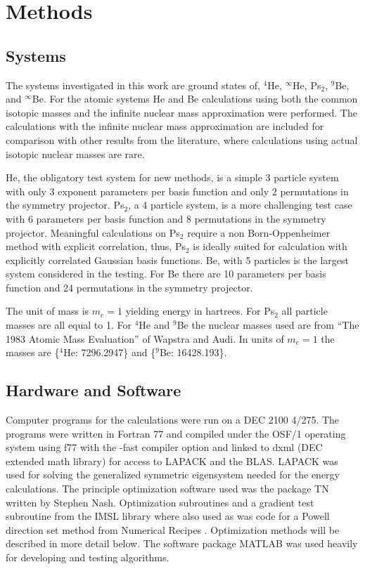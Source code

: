 \documentclass[12pt,thmsa,suthesis,verbatim]{report}
\begin{document}
\section{Methods}

\subsection{Systems}

The systems investigated in this work are ground states of, $^4$He, $^\infty 
$He, Ps$_2$, $^9$Be, and $^\infty $Be. For the atomic systems He and Be
calculations using both the common isotopic masses and the infinite nuclear
mass approximation were performed. The calculations with the infinite
nuclear mass approximation are included for comparison with other results
from the literature, where calculations using actual isotopic nuclear masses
are rare.

He, the obligatory test system for new methods, is a simple 3 particle
system with only 3 exponent parameters per basis function and only 2
permutations in the symmetry projector. Ps$_2$, a 4 particle system, is a
more challenging test case with 6 parameters per basis function and 8
permutations in the symmetry projector. Meaningful calculations on Ps$_2$
require a non Born-Oppenheimer method with explicit correlation, thus, Ps$_2$
is ideally suited for calculation with explicitly correlated Gaussian basis
functions. Be, with 5 particles is the largest system considered in the
testing. For Be there are 10 parameters per basis function and 24
permutations in the symmetry projector.

The unit of mass is $m_e=1$ yielding energy in hartrees. For Ps$_2$ all
particle masses are all equal to 1. For $^4$He and $^9$Be the nuclear masses
used are from ``The 1983 Atomic Mass Evaluation'' of Wapstra and Audi\cite
{Wapstra}. In units of $m_e=1$ the masses are \{$^4$He: 7296.2947\} and \{$%
^9 $Be: 16428.193\}.

\subsection{Hardware and Software}

Computer programs for the calculations were run on a DEC 2100 4/275. The
programs were written in Fortran 77 and compiled under the OSF/1 operating
system using f77 with the -fast compiler option and linked to dxml (DEC
extended math library) for access to LAPACK\cite{LAPACK} and the BLAS.
LAPACK was used for solving the generalized symmetric eigensystem needed for
the energy calculations. The principle optimization software used was the
package TN written by Stephen Nash\cite{NashTN}. Optimization subroutines
and a gradient test subroutine from the IMSL\cite{IMSL} library where also
used as was code for a Powell direction set method from Numerical Recipes%
\cite{NRinFortran}. Optimization methods will be described in more detail
below. The software package MATLAB\cite{MATLAB} was used heavily for
developing and testing algorithms.
\end{document}
